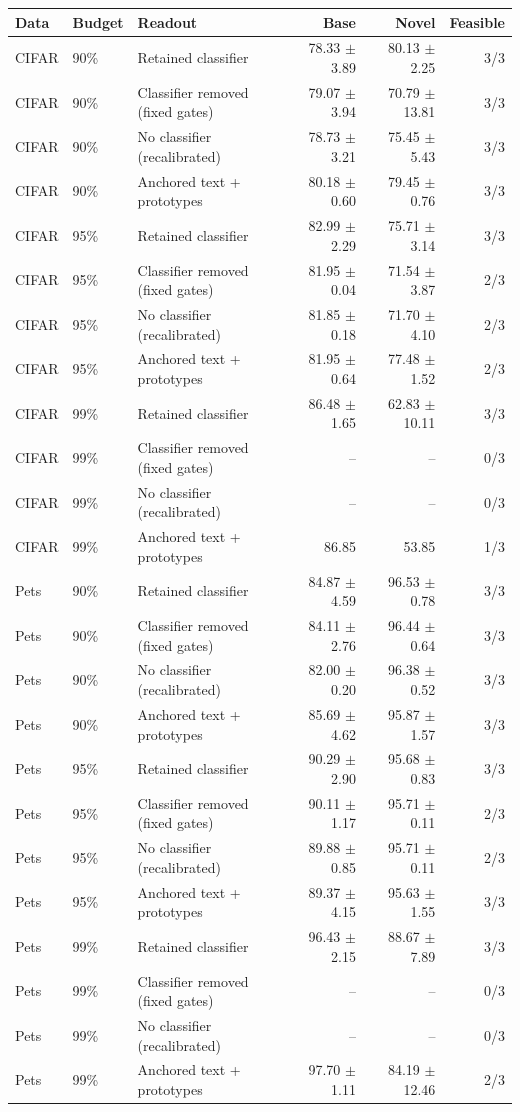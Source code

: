 \begin{tabular}{lllrrr}
\toprule
Data & Budget & Readout & Base & Novel & Feasible \\
\midrule
CIFAR & 90\% & Retained classifier & 78.33 $\pm$ 3.89 & 80.13 $\pm$ 2.25 & 3/3 \\
CIFAR & 90\% & Classifier removed (fixed gates) & 79.07 $\pm$ 3.94 & 70.79 $\pm$ 13.81 & 3/3 \\
CIFAR & 90\% & No classifier (recalibrated) & 78.73 $\pm$ 3.21 & 75.45 $\pm$ 5.43 & 3/3 \\
CIFAR & 90\% & Anchored text + prototypes & 80.18 $\pm$ 0.60 & 79.45 $\pm$ 0.76 & 3/3 \\
CIFAR & 95\% & Retained classifier & 82.99 $\pm$ 2.29 & 75.71 $\pm$ 3.14 & 3/3 \\
CIFAR & 95\% & Classifier removed (fixed gates) & 81.95 $\pm$ 0.04 & 71.54 $\pm$ 3.87 & 2/3 \\
CIFAR & 95\% & No classifier (recalibrated) & 81.85 $\pm$ 0.18 & 71.70 $\pm$ 4.10 & 2/3 \\
CIFAR & 95\% & Anchored text + prototypes & 81.95 $\pm$ 0.64 & 77.48 $\pm$ 1.52 & 2/3 \\
CIFAR & 99\% & Retained classifier & 86.48 $\pm$ 1.65 & 62.83 $\pm$ 10.11 & 3/3 \\
CIFAR & 99\% & Classifier removed (fixed gates) & -- & -- & 0/3 \\
CIFAR & 99\% & No classifier (recalibrated) & -- & -- & 0/3 \\
CIFAR & 99\% & Anchored text + prototypes & 86.85 & 53.85 & 1/3 \\
Pets & 90\% & Retained classifier & 84.87 $\pm$ 4.59 & 96.53 $\pm$ 0.78 & 3/3 \\
Pets & 90\% & Classifier removed (fixed gates) & 84.11 $\pm$ 2.76 & 96.44 $\pm$ 0.64 & 3/3 \\
Pets & 90\% & No classifier (recalibrated) & 82.00 $\pm$ 0.20 & 96.38 $\pm$ 0.52 & 3/3 \\
Pets & 90\% & Anchored text + prototypes & 85.69 $\pm$ 4.62 & 95.87 $\pm$ 1.57 & 3/3 \\
Pets & 95\% & Retained classifier & 90.29 $\pm$ 2.90 & 95.68 $\pm$ 0.83 & 3/3 \\
Pets & 95\% & Classifier removed (fixed gates) & 90.11 $\pm$ 1.17 & 95.71 $\pm$ 0.11 & 2/3 \\
Pets & 95\% & No classifier (recalibrated) & 89.88 $\pm$ 0.85 & 95.71 $\pm$ 0.11 & 2/3 \\
Pets & 95\% & Anchored text + prototypes & 89.37 $\pm$ 4.15 & 95.63 $\pm$ 1.55 & 3/3 \\
Pets & 99\% & Retained classifier & 96.43 $\pm$ 2.15 & 88.67 $\pm$ 7.89 & 3/3 \\
Pets & 99\% & Classifier removed (fixed gates) & -- & -- & 0/3 \\
Pets & 99\% & No classifier (recalibrated) & -- & -- & 0/3 \\
Pets & 99\% & Anchored text + prototypes & 97.70 $\pm$ 1.11 & 84.19 $\pm$ 12.46 & 2/3 \\
\bottomrule
\end{tabular}